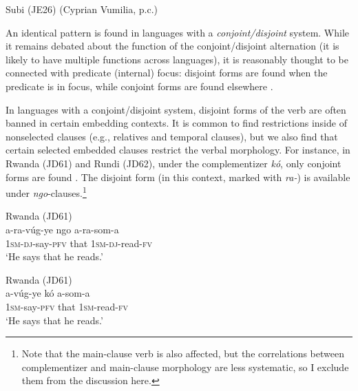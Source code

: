 \documentclass[output=paper,colorlinks,citecolor=brown,
]{langscibook}
\begin{document}
%

\ea Subi (JE26) (Cyprian Vumilia, p.c.)
	\begin{xlist}
	\end{xlist}
\z



An identical pattern is found in languages with a \textit{conjoint/disjoint} system. While it remains  debated about the function of the conjoint/disjoint alternation (it is likely to have multiple functions across languages), it is reasonably thought to be connected with predicate (internal) focus: disjoint forms are found when the predicate is in focus, while conjoint forms are found elsewhere \citep{VanderWal:2016conjoint}. 

In languages with a conjoint/disjoint system,  disjoint forms of the verb are often banned in certain embedding contexts. It is common to find restrictions inside of nonselected clauses (e.g., relatives and temporal clauses), but we also find that certain selected embedded clauses restrict the verbal morphology. For instance, in Rwanda (JD61) and Rundi (JD62), under the complementizer \textit{k\'o}, only conjoint forms are found \citep{NgobokaZeller:2016, NshemezimanaBostoen:2016}. The disjoint form (in this context, marked with \textit{ra-}) is available under \textit{ngo}-clauses.\footnote{Note that the main-clause verb is also affected, but the correlations between complementizer and main-clause morphology are less systematic, so I exclude them from the discussion here.}
\ea
	\begin{xlist}
	\ex Rwanda (JD61) \citep[366]{NgobokaZeller:2016} \\
	\gll a-ra-v\'ug-ye ngo a-ra-som-a\\
	1\textsc{sm}-\textsc{dj}-say-\textsc{pfv} that 1\textsc{sm}-\textsc{dj}-read-\textsc{fv}\\
	\glt `He says that he reads.'  
	
	\ex Rwanda (JD61) \citep[365]{NgobokaZeller:2016} \\
	\gll a-v\'ug-ye k\'o a-som-a\\
	1\textsc{sm}-say-\textsc{pfv} that 1\textsc{sm}-read-\textsc{fv}\\
	\glt `He says that he reads.' 
	\end{xlist}
\z
\end{document}
